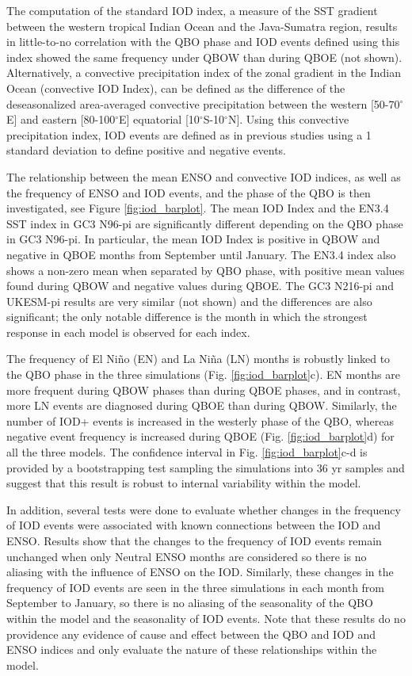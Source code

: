 The computation of the standard IOD index, a measure of the SST gradient between the western tropical Indian Ocean and the Java-Sumatra region, results in little-to-no correlation with the QBO phase and IOD events defined using this index showed the same frequency under QBOW than during QBOE (not shown). 
Alternatively, a convective precipitation index of the zonal gradient in the Indian Ocean (convective IOD Index), can be defined as the difference of the deseasonalized area-averaged convective precipitation between the western [50-70$^\circ$E] and eastern [80-100$^\circ$E] equatorial [10$^\circ$S-10$^\circ$N]. 
Using this convective precipitation index, IOD events are defined as in previous studies using a 1 standard deviation to define positive and negative events. 

The relationship between the mean ENSO and convective IOD indices, as well as the frequency of ENSO and IOD events, and the phase of the QBO is then investigated, see Figure \ref{fig:iod_barplot}. 
The mean IOD Index and the EN3.4 SST index in GC3 N96-pi are significantly different depending on the QBO phase in GC3 N96-pi. In particular, the mean IOD Index is positive in QBOW and negative in QBOE months from September until January. The EN3.4 index also shows a non-zero mean when separated by QBO phase, with positive mean values found during QBOW and negative values during QBOE. 
The GC3 N216-pi and UKESM-pi results are very similar (not shown) and the differences are also significant; the only notable difference is the month in which the strongest response in each model is observed for each index. 

The frequency of El Niño (EN) and La Niña (LN) months is robustly linked to the QBO phase in the three simulations (Fig. \ref{fig:iod_barplot}c). 
EN months are more frequent during QBOW phases than during QBOE phases, and in contrast, more LN events are diagnosed during QBOE than during QBOW. 
Similarly, the number of IOD+ events is increased in the westerly phase of the QBO, whereas negative event frequency is increased during QBOE (Fig. \ref{fig:iod_barplot}d) for all the three models. 
The confidence interval in Fig.  \ref{fig:iod_barplot}c-d  is provided by a bootstrapping test sampling the simulations into 36 yr samples and suggest that this result is robust to internal variability within the model. 


In addition, several tests were done to evaluate whether changes in the frequency of IOD events were associated with known connections between the IOD and ENSO. 
Results show that the changes to the frequency of IOD events remain unchanged when only Neutral ENSO months are considered so there is no aliasing with the influence of ENSO on the IOD. Similarly, these changes in the frequency of IOD events are seen in the three simulations in each month from September to January, so there is no aliasing of the seasonality of the QBO within the model and the seasonality of IOD events. 
Note that these results do no providence any evidence of cause and effect between the QBO and IOD and ENSO indices and only evaluate the nature of these relationships within the model.

